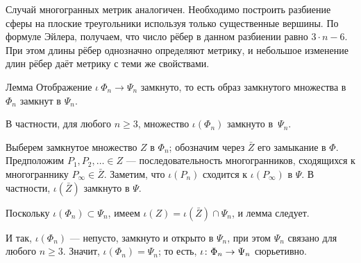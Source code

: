 \documentclass[oneside,a4paper]{article}
\begin{document}
Случай многогранных метрик аналогичен.
Необходимо построить разбиение сферы на плоские треугольники используя только существенные вершины.
По формуле Эйлера, получаем, что число рёбер в данном разбиении равно $3\cdot n-6$.
При этом длины рёбер однозначно определяют метрику, и небольшое изменение длин рёбер даёт метрику с теми же свойствами.


\begin{thm}{Лемма}
Отображение $\iota\:\Phi_n\to\Psi_n$ замкнуто, 
то есть образ замкнутого множества в $\Phi_n$ замкнут в $\Psi_n$.

В частности, для любого $n\ge 3$, множество $\iota(\Phi_n)$ замкнуто в~$\Psi_n$.
\end{thm}

Выберем замкнутое множество $Z$ в $\Phi_n$;
обозначим через $\bar Z$ его замыкание в $\Phi$.
Предположим $P_1,P_2,\dots\in Z$ --- последовательность многогранников, сходящихся к многограннику $P_\infty\in\bar Z$.
Заметим, что $\iota(P_n)$ сходится к $\iota(P_\infty)$  в $\Psi$.
В частности, $\iota(\bar Z)$ замкнуто в $\Psi$.

Поскольку $\iota(\Phi_n)\subset \Psi_n$, имеем $\iota (Z)=\iota(\bar Z)\cap \Psi_n$, и лемма следует. 

\medskip

И так, $\iota(\Phi_n)$ --- непусто, замкнуто и открыто в $\Psi_n$, при этом $\Psi_n$ связано для любого $n\ge 3$.
Значит, $\iota(\Phi_n)=\Psi_n$; то есть, $\iota\:\Phi_n\z\to\Psi_n$ сюрьетивно.
\qeds

\sloppy
\printbibliography[heading=bibintoc]
\fussy
\end{document}

